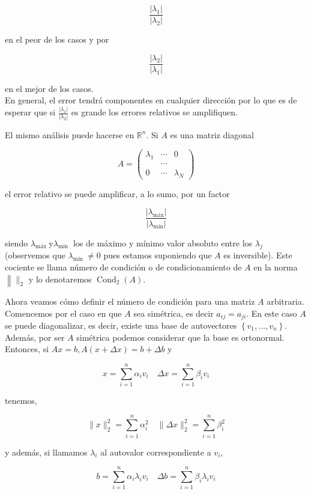\documentclass[10pt]{article}
\begin{document}
$$
\frac{\left|\lambda_{1}\right|}{\left|\lambda_{2}\right|}
$$

en el peor de los casos y por

$$
\frac{\left|\lambda_{2}\right|}{\left|\lambda_{1}\right|}
$$

en el mejor de los casos.\\
En general, el error tendrá componentes en cualquier dirección por lo que es de esperar que si $\frac{\left|\lambda_{1}\right|}{\left|\lambda_{2}\right|}$ es grande los errores relativos se amplifiquen.

El mismo análisis puede hacerse en $\mathbb{R}^{n}$. Si $A$ es una matriz diagonal

$$
A=\left(\begin{array}{ccc}
\lambda_{1} & \cdots & 0 \\
& \cdots & \\
0 & \cdots & \lambda_{N}
\end{array}\right)
$$

el error relativo se puede amplificar, a lo sumo, por un factor

$$
\frac{\left|\lambda_{\operatorname{máx}}\right|}{\left|\lambda_{\operatorname{mín}}\right|}
$$

siendo $\lambda_{\text {máx }} \mathrm{y} \lambda_{\text {mín }}$ los de máximo y mínimo valor absoluto entre los $\lambda_{j}$ (observemos que $\lambda_{\text {mín }} \neq 0$ pues estamos suponiendo que $A$ es inversible). Este cociente se llama número de condición o de condicionamiento de $A$ en la norma $\left\|\|_{2}\right.$ y lo denotaremos $\operatorname{Cond}_{2}(A)$.

Ahora veamos cómo definir el número de condición para una matriz $A$ arbitraria. Comencemos por el caso en que $A$ sea simétrica, es decir $a_{i j}=a_{j i}$. En este caso $A$ se puede diagonalizar, es decir, existe una base de autovectores $\left\{v_{1}, \ldots, v_{n}\right\}$. Además, por ser $A$ simétrica podemos considerar que la base es ortonormal. Entonces, si $A x=b, A(x+\Delta x)=b+\Delta b$ y

$$
x=\sum_{i=1}^{n} \alpha_{i} v_{i} \quad \Delta x=\sum_{i=1}^{n} \beta_{i} v_{i}
$$

tenemos,

$$
\|x\|_{2}^{2}=\sum_{i=1}^{n} \alpha_{i}^{2} \quad\|\Delta x\|_{2}^{2}=\sum_{i=1}^{n} \beta_{i}^{2}
$$

y además, si llamamos $\lambda_{i}$ al autovalor correspondiente a $v_{i}$,

$$
b=\sum_{i=1}^{n} \alpha_{i} \lambda_{i} v_{i} \quad \Delta b=\sum_{i=1}^{n} \beta_{i} \lambda_{i} v_{i}
$$
\end{document}
